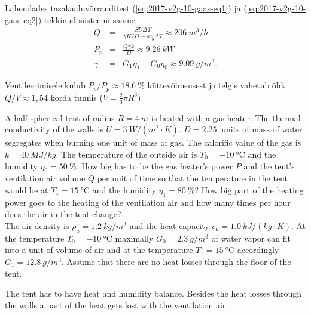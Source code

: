{Lahendades tasakaaluvõrranditest (\ref{eq:2017-v2g-10-gaas-eq1}) ja (\ref{eq:2017-v2g-10-gaas-eq2})
tekkinud süsteemi saame
\vspace{-3pt}
\begin{eqnarray*}
	Q & = & \frac{SU\Delta T}{\gamma K/D-\rho c_{\tilde{o}}\Delta T}\approx\SI{206}{m^{3}/h}\\
	P_{p} & = & \frac{Q\gamma k}{D}\approx\SI{9.26}{kW}\\
	\gamma & = & G_{1}\eta_{1}-G_{0}\eta_{0}\approx\SI{9.09}{g/m^{3}}.
\end{eqnarray*}


Ventileerimisele kulub $P_{v}/P_{p}\approx\SI{18.6}{\percent}$ küttevõimsusest
ja telgis vahetub õhk $Q/V\approx1,54$ korda tunnis ($V=\frac{2}{3}\pi R^{3}$).
\fi


\ifEngStatement
A half-spherical tent of radius $R=\SI{4}{m}$ is heated with a gas heater. The thermal conductivity of the walls is $U=\SI{3}{W/\left(m^{2}\cdot K\right)}$. $D=\SI{2.25}{}$ units of mass of water segregates when burning one unit of mass of gas. The calorific value of the gas is $k=\SI{40}{MJ/kg}$. The temperature of the outside air is $T_{0}=\SI{-10}{\celsius}$ and the humidity $\eta_{0}=\SI{50}{\percent}$. How big has to be the gas heater’s power $P$ and the tent’s ventilation air volume $Q$ per unit of time so that the temperature in the tent would be at $T_{1}=\SI{15}{\celsius}$ and the humidity $\eta_{1}=\SI{80}{\percent}$? How big part of the heating power goes to the heating of the ventilation air and how many times per hour does the air in the tent change?\\
The air density is $\rho_{a}=\SI{1.2}{kg/m^{3}}$ and the heat capacity $c_{a}=\SI{1.0}{kJ/\left(kg\cdot K\right)}$. At the temperature $T_{0}=\SI{-10}{\celsius}$ maximally $G_{0}=\SI{2.3}{g/m^{3}}$ of water vapor can fit into a unit of volume of air and at the temperature $T_{1}=\SI{15}{\celsius}$ accordingly $G_{1}=\SI{12.8}{g/m^{3}}$. Assume that there are no heat losses through the floor of the tent.
\fi


\ifEngHint
The tent has to have heat and humidity balance. Besides the heat losses through the walls a part of the heat gets lost with the ventilation air.
\fi


}
